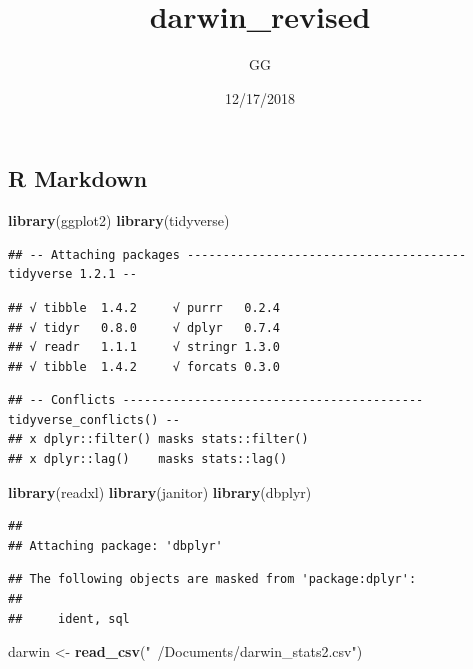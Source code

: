 \documentclass[]{article}
\title{darwin\_revised}
\author{GG}
\date{12/17/2018}
\newenvironment{Shaded}{\begin{snugshade}}{\end{snugshade}}
\newcommand{\KeywordTok}[1]{\textcolor[rgb]{0.13,0.29,0.53}{\textbf{#1}}}
\newcommand{\StringTok}[1]{\textcolor[rgb]{0.31,0.60,0.02}{#1}}
\newcommand{\NormalTok}[1]{#1}
\begin{document}
\maketitle

\subsection{R Markdown}\label{r-markdown}

\begin{Shaded}
\begin{Highlighting}[]
\KeywordTok{library}\NormalTok{(ggplot2)}
\KeywordTok{library}\NormalTok{(tidyverse)}
\end{Highlighting}
\end{Shaded}

\begin{verbatim}
## -- Attaching packages --------------------------------------- tidyverse 1.2.1 --
\end{verbatim}

\begin{verbatim}
## √ tibble  1.4.2     √ purrr   0.2.4
## √ tidyr   0.8.0     √ dplyr   0.7.4
## √ readr   1.1.1     √ stringr 1.3.0
## √ tibble  1.4.2     √ forcats 0.3.0
\end{verbatim}

\begin{verbatim}
## -- Conflicts ------------------------------------------ tidyverse_conflicts() --
## x dplyr::filter() masks stats::filter()
## x dplyr::lag()    masks stats::lag()
\end{verbatim}

\begin{Shaded}
\begin{Highlighting}[]
\KeywordTok{library}\NormalTok{(readxl)}
\KeywordTok{library}\NormalTok{(janitor)}
\KeywordTok{library}\NormalTok{(dbplyr)}
\end{Highlighting}
\end{Shaded}

\begin{verbatim}
## 
## Attaching package: 'dbplyr'
\end{verbatim}

\begin{verbatim}
## The following objects are masked from 'package:dplyr':
## 
##     ident, sql
\end{verbatim}

\begin{Shaded}
\begin{Highlighting}[]
\NormalTok{darwin <-}\StringTok{ }\KeywordTok{read_csv}\NormalTok{(}\StringTok{"~/Documents/darwin_stats2.csv"}\NormalTok{)}
\end{Highlighting}
\end{Shaded}
\end{document}
